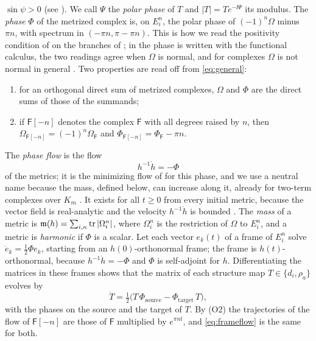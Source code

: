 $\sin\psi>0$ (see \cite[Lemma~2.2]{wue26a}). We call $\Psi$ the \emph{polar
phase} of $T$ and $|T|=Te^{-\ii\Psi}$ its modulus. The \emph{phase} $\Phi$ of
the metrized complex is, on $E_i^n$, the polar phase of $(-1)^n\Omega$ minus
$\pi n$, with spectrum in $(-\pi n,\pi-\pi n)$. This is how we read the
positivity condition of \cite[\S4.2]{hkkp26} on the branches of
\cite[(5.15)]{hkkp26}; in \cite[\S5.4]{hkkp26} the phase is written with the
functional calculus, the two readings agree when $\Omega$ is normal, and for
complexes $\Omega$ is not normal in general \cite[Example~2.3]{wue26a}. Two
properties are read off from \eqref{eq:general}:
\begin{enumerate}
\item[(O1)] for an orthogonal direct sum of metrized complexes, $\Omega$ and
 $\Phi$ are the direct sums of those of the summands;
\item[(O2)] if $\mathsf F[-n]$ denotes the complex $\mathsf F$ with all
 degrees raised by $n$, then $\Omega_{\mathsf F[-n]}=(-1)^n\Omega_{\mathsf F}$
 and $\Phi_{\mathsf F[-n]}=\Phi_{\mathsf F}-\pi n$.
\end{enumerate}
The \emph{phase flow} is the flow
\begin{equation}\label{eq:flow}
 h^{-1}\dot h=-\Phi
\end{equation}
of the metrics; it is the minimizing flow of \cite[\S4.1]{hkkp26} for this
phase, and we use a neutral name because the mass, defined below, can
increase along it, already for two-term complexes over $K_m$
\cite[Theorem~1.1]{wue26a}. It exists for all $t\geq0$ from every initial
metric, because the vector field is real-analytic and the velocity
$h^{-1}\dot h$ is bounded \cite[Proposition~2.2]{wue26c}. The \emph{mass} of a metric is
$\mathfrak m(h)=\sum_{i,n}\operatorname{tr}|\Omega_i^n|$, where $\Omega_i^n$ is the restriction
of $\Omega$ to $E_i^n$, and a metric is \emph{harmonic} if $\Phi$ is a
scalar. Let each vector $e_k(t)$ of a frame of $E_i^n$ solve
$\dot e_k=\frac12\Phi e_k$, starting from an $h(0)$-orthonormal frame; the
frame is $h(t)$-orthonormal, because $h^{-1}\dot h=-\Phi$ and $\Phi$ is
self-adjoint for $h$. Differentiating the matrices in these frames shows
that the matrix of each structure map $T\in\{d_i,\rho_a\}$ evolves by
\begin{equation}\label{eq:frameflow}
 \dot T=\tfrac12\bigl(T\,\Phi_{\mathrm{source}}-\Phi_{\mathrm{target}}\,T\bigr),
\end{equation}
with the phases on the source and the target of $T$. By (O2) the
trajectories of the flow of $\mathsf F[-n]$ are those of $\mathsf F$
multiplied by $e^{\pi nt}$, and \eqref{eq:frameflow} is the same for both.

